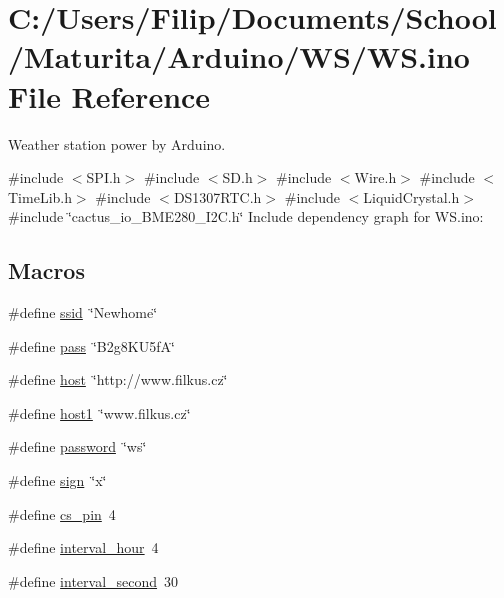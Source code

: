 \hypertarget{_w_s_8ino}{}\section{C\+:/\+Users/\+Filip/\+Documents/\+School/\+Maturita/\+Arduino/\+W\+S/\+WS.ino File Reference}
\label{_w_s_8ino}


Weather station power by Arduino.  


{\ttfamily \#include $<$S\+P\+I.\+h$>$}\newline
{\ttfamily \#include $<$S\+D.\+h$>$}\newline
{\ttfamily \#include $<$Wire.\+h$>$}\newline
{\ttfamily \#include $<$Time\+Lib.\+h$>$}\newline
{\ttfamily \#include $<$D\+S1307\+R\+T\+C.\+h$>$}\newline
{\ttfamily \#include $<$Liquid\+Crystal.\+h$>$}\newline
{\ttfamily \#include \char`\"{}cactus\+\_\+io\+\_\+\+B\+M\+E280\+\_\+\+I2\+C.\+h\char`\"{}}\newline
Include dependency graph for W\+S.\+ino\+:
\subsection*{Macros}
\begin{DoxyCompactItemize}
\item 
\#define \hyperlink{_w_s_8ino_abd15b8fcd3b82c2827693b9fd882a206}{ssid}~\char`\"{}Newhome\char`\"{}
\item 
\#define \hyperlink{_w_s_8ino_a9f2587d1070b8924b276ba83988d3667}{pass}~\char`\"{}B2g8\+K\+U5fA\char`\"{}
\item 
\#define \hyperlink{_w_s_8ino_ad9949162675c2cb74b115f5dfb224732}{host}~\char`\"{}http\+://www.\+filkus.\+cz\char`\"{}
\item 
\#define \hyperlink{_w_s_8ino_a9e2e38c07417ce7edf45d45a5a6b92c9}{host1}~\char`\"{}www.\+filkus.\+cz\char`\"{}
\item 
\#define \hyperlink{_w_s_8ino_ae59dfb8ffddb9128834034516c45e7ce}{password}~\char`\"{}ws\char`\"{}
\item 
\#define \hyperlink{_w_s_8ino_a9d8dc79272f5859f2c509c88f073dbde}{sign}~\char`\"{}x\char`\"{}
\item 
\#define \hyperlink{_w_s_8ino_ad7860cb7dbe49e4f2ebde8c624b448ef}{cs\+\_\+pin}~4
\item 
\#define \hyperlink{_w_s_8ino_a4e07ce7aef83b2e94bd353d77029423e}{interval\+\_\+hour}~4
\item 
\#define \hyperlink{_w_s_8ino_a0a56e85c196bfb2b3bf61abe7f007541}{interval\+\_\+second}~30
\end{DoxyCompactItemize}
